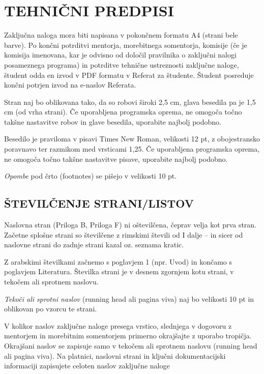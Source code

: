 \chapter{TEHNIČNI PREDPISI}

Zaključna naloga mora biti napisana v pokončnem formatu A4 (strani bele barve). Po končni potrditvi mentorja, morebitnega somentorja, komisije (če je komisija imenovana, kar je odvisno od določil pravilnika o zaključni nalogi posameznega programa) in potrditve tehnične ustreznosti zaključne naloge, študent odda en izvod v PDF formatu v Referat za
študente. Študent posreduje končni potrjen izvod na e-naslov Referata.

Stran naj bo oblikovana tako, da so robovi široki 2,5 cm, glava besedila pa je 1,5 cm (od vrha strani). Če uporabljena programska oprema, ne omogoča točno takšne nastavitve robov in glave besedila, uporabite najbolj podobno.

Besedilo je praviloma v pisavi Times New Roman, velikosti 12 pt, z obojestransko
poravnavo ter razmikom med vrsticami 1,25. Če uporabljena programska oprema, ne omogoča točno takšne nastavitve pisave, uporabite najbolj podobno.

\emph{Opombe} pod črto (footnotes) se pišejo v velikosti 10 pt.

\section{ŠTEVILČENJE STRANI/LISTOV}

Naslovna stran (Priloga B, Priloga F) ni oštevilčena, čeprav velja kot prva stran. Začetne splošne strani so številčene z rimskimi števili od I dalje – in sicer od naslovne strani do zadnje strani kazal oz. seznama kratic.

Z arabskimi številkami začnemo s poglavjem 1 (npr. Uvod) in končamo s poglavjem Literatura. Številka strani je v desnem zgornjem kotu strani, v tekočem ali sprotnem naslovu.

\emph{Tekoči ali sprotni naslov} (running head ali pagina viva) naj bo velikosti 10 pt in oblikovan po vzorcu te strani.

V kolikor naslov zaključne naloge presega vrstico, slednjega v dogovoru z mentorjem in morebitnim somentorjem primerno okrajšajte z uporabo tropičja. Okrajšani naslov se zapisuje samo v tekočem ali sprotnem naslovu (running head ali pagina viva). Na platnici, naslovni strani in ključni dokumentacijski informaciji zapisujete celoten naslov zaključne
naloge

